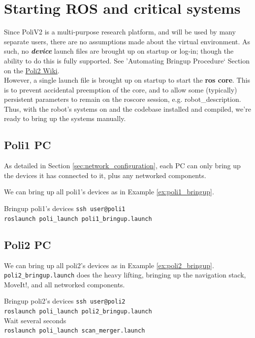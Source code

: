 \section{Starting ROS and critical systems}
Since PoliV2 is a multi-purpose research platform, and will be used by many separate users, there are no assumptions made about the virtual environment.
As such, no \textit{\textbf{device}} launch files are brought up on startup or log-in; though the ability to do this is fully supported. See 'Automating Bringup Procedure` Section on the \href{https://github.com/si-machines/poli2/wiki/How-To}{Poli2 Wiki}.\\


However, a single launch file is brought up on startup to start the \textbf{ros core}. This is to prevent accidental preemption of the core, and to allow some (typically) persistent parameters to remain on the roscore session, e.g. robot\_description. \\



Thus, with the robot's systems on and the codebase installed and compiled, we're ready to bring up the systems manually.

\subsection{Poli1 PC}
As detailed in Section \ref{sec:network_configuration}, each PC can only bring up the devices it has connected to it, plus any networked components. 

We can bring up all poli1's devices as in Example \ref{ex:poli1_bringup}.

\begin{example}{Bringup poli1's devices}
  \label{ex:poli1_bringup}
    \texttt{ssh user@poli1} \\
  \texttt{roslaunch poli\_launch poli1\_bringup.launch}
\end{example}

\subsection{Poli2 PC}
We can bring up all poli2's devices as in Example \ref{ex:poli2_bringup}.
\texttt{poli2\_bringup.launch} does the heavy lifting, bringing up the navigation stack, MoveIt!, and all networked components. \\

\begin{example}{Bringup poli2's devices}
  \label{ex:poli2_bringup}
  \texttt{ssh user@poli2} \\
  \texttt{roslaunch poli\_launch poli2\_bringup.launch} \\
  Wait several seconds \\
  \texttt{roslaunch poli\_launch scan\_merger.launch}
\end{example}

